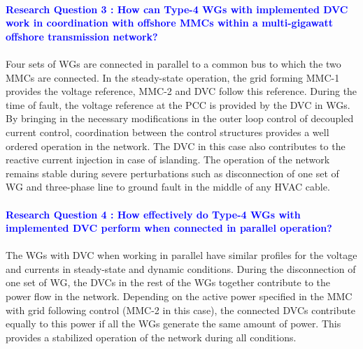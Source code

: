 \paragraph{\textcolor{blue}{Research Question 3 : How can Type-4 \gls{WG}s with implemented \gls{DVC} work in coordination with offshore \gls{MMC}s within a multi-gigawatt offshore transmission network?}}

\paragraph{} Four sets of \gls{WG}s are connected in parallel to a common bus to which the two \gls{MMC}s are connected. In the steady-state operation, the grid forming \gls{MMC}-1 provides the voltage reference, \gls{MMC}-2 and \gls{DVC} follow this reference. During the time of fault, the voltage reference at the \gls{PCC} is provided by the \gls{DVC} in \gls{WG}s. By bringing in the necessary modifications in the outer loop control of decoupled current control, coordination between the control structures provides a well ordered operation in the network. The \gls{DVC} in this case also contributes to the reactive current injection in case of islanding. The operation of the network remains stable during severe perturbations such as disconnection of one set of \gls{WG} and three-phase line to ground fault in the middle of any \gls{HVAC} cable.

\paragraph{\textcolor{blue}{Research Question 4 : How effectively do Type-4 \gls{WG}s with implemented \gls{DVC} perform when connected in parallel operation?}}

\paragraph{} The \gls{WG}s with \gls{DVC} when working in parallel have similar profiles for the voltage and currents in steady-state and dynamic conditions. During the disconnection of one set of \gls{WG}, the \gls{DVC}s in the rest of the \gls{WG}s together contribute to the power flow in the network. Depending on the active power specified in the \gls{MMC} with grid following control (\gls{MMC}-2 in this case), the connected \gls{DVC}s contribute equally to this power if all the \gls{WG}s generate the same amount of power. This provides a stabilized operation of the network during all conditions.  

